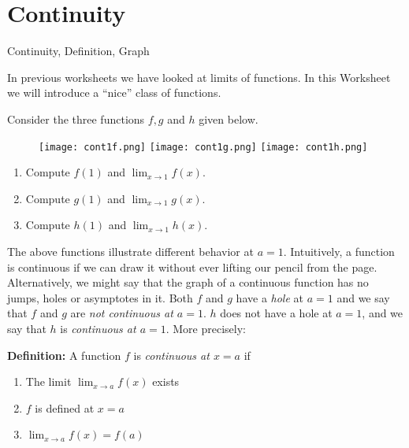 \section{Continuity}

\begin{tagblock}{Continuity, Definition, Graph}
\begin{question}
	In previous worksheets we have looked at limits of functions.  In this Worksheet we will introduce a ``nice'' class of functions.  



Consider the three functions $f, g$ and $h$ given below.  

\begin{figure}[h]
\texttt{[image: cont1f.png]} \hspace{.05in} \texttt{[image: cont1g.png]} \hspace{.05in} \texttt{[image: cont1h.png]}
\end{figure}
\begin{enumerate}
\item Compute $f(1)$ and $\displaystyle \lim_{x \to 1} f(x)$.
\item Compute $g(1)$ and $\displaystyle \lim_{x \to 1} g(x)$.
\item Compute $h(1)$ and $\displaystyle \lim_{x \to 1} h(x)$.

\end{enumerate}


\bigskip
The above functions illustrate different behavior at $a=1$.  Intuitively, a function is continuous if we can draw it without ever lifting our pencil from the page. Alternatively, we might say that the graph of a continuous function has no jumps, holes or asymptotes in it.  Both $f$ and $g$ have a 	\emph{hole} at $a=1$ and we say that $f$ and $g$ are \emph{not continuous at $a=1$}.  $h$ does not have a hole at $a=1$, and we say that $h$ is \emph{continuous at $a=1$}.  More precisely:

\textbf{Definition:}  A function $f$ is \emph{continuous at $x=a$} if 
\begin{enumerate}
\item The limit $\displaystyle \lim_{x \to a} f(x)$ exists
\item $f$ is defined at $x =a$
\item $\displaystyle \lim_{x \to a} f(x)=f(a)$
\end{enumerate}



\end{question}
\end{tagblock}
